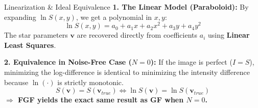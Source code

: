 \begin{frame}{Linearization \& Ideal Equivalence}
    \textbf{1. The Linear Model (Paraboloid):}
    By expanding $\ln S(x, y)$, we get a polynomial in $x, y$:
    \[
        \ln S(x, y) = a_0 + a_1 x + a_2 x^2 + a_3 y + a_4 y^2
    \]
    The star parameters $\mathbf{v}$ are recovered directly from coefficients $a_i$ using \textbf{Linear Least Squares}.

    \vspace{0.4cm}
    \textbf{2. Equivalence in Noise-Free Case ($N=0$):}
    If the image is perfect ($I = S$), minimizing the log-difference is identical to minimizing the intensity difference because $\ln(\cdot)$ is strictly monotonic.
    \[
        S(\mathbf{v}) = S(\mathbf{v}_{true}) \iff \ln S(\mathbf{v}) = \ln S(\mathbf{v}_{true})
    \]
    \textcolor{green!60!black}{\textbf{$\Rightarrow$ FGF yields the exact same result as GF when $N=0$.}}
\end{frame}

